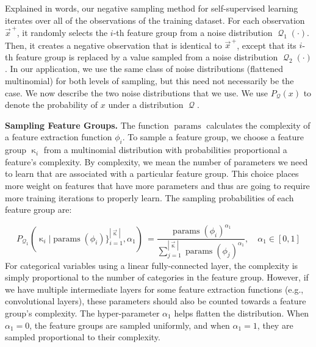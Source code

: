 \documentclass{article}
\newcommand{\vect}[1]{\vec{#1}}
\DeclareMathOperator{\q}{{\mathcal{Q}}}
\begin{document}
Explained in words, our negative sampling method for self-supervised learning iterates over all of the observations of the training dataset.
For each observation $\vect{x}^{\,+}$, it randomly selects the $i$-th feature group from a noise distribution $\q_1(\cdot)$.
Then,  it creates a negative observation that is identical to $\vect{x}^{\,+}$, except that its $i$-th feature group is replaced by a value sampled from a noise distribution $\q_2(\cdot)$.
In our application, we use the same class of noise distributions (flattened multinomial) for both levels of sampling, but this need not necessarily be the case.
We now describe the two noise distributions that we use.
We use  $P_{\q}(x)$ to denote the probability of $x$ under a distribution $\q$.

\textbf{Sampling Feature Groups.} The function $\operatorname{params}$ calculates the complexity of a  feature extraction function $\phi_i$.
To sample a feature group, we choose a feature group $\upkappa_i$ from a multinomial distribution with probabilities proportional a feature's complexity.
By complexity, we mean the number of parameters we need to learn that are associated with a particular feature group.
This choice places more weight on features that have more parameters and thus are going to require more training iterations to properly learn. The sampling probabilities of each feature group are:

\begin{equation}
P_{\q_1}(\upkappa_i|\operatorname{params}(\phi_i)\}_{i=1}^{|\vect{\upkappa}|},\alpha_1 )  \
= \frac{\operatorname{params}(\phi_i)^{\alpha_1}}{\sum_{j=1}^{|\vect{\upkappa}|} \operatorname{params}(\phi_j)^{\alpha_1}},  \quad \alpha_1 \in [0,1]
\end{equation}
For categorical variables using a linear fully-connected layer, the complexity is simply proportional to the number of categories in the feature group.
However, if we have multiple intermediate layers for some feature extraction functions (e.g., convolutional layers), these parameters should also be counted towards a feature group's complexity.
The hyper-parameter $\alpha_1$ helps flatten the distribution.
 When  $\alpha_1=0$, the feature groups are sampled uniformly,
 and when $\alpha_1=1$, they are sampled proportional to their complexity.
\end{document}
